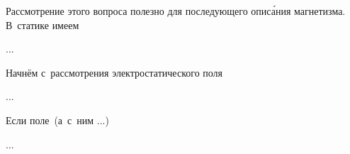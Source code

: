 

\begin{otherlanguage}{russian}

Рассмотрение этого вопроса полезно для последующего опис\'{а}ния магнетизма. В~статике имеем

...



\end{otherlanguage}



\begin{otherlanguage}{russian}

Начнём с~рассмотрения электростатического поля

...



\end{otherlanguage}



\begin{otherlanguage}{russian}

Если поле~(а~с~ним ...)

...



\end{otherlanguage}


